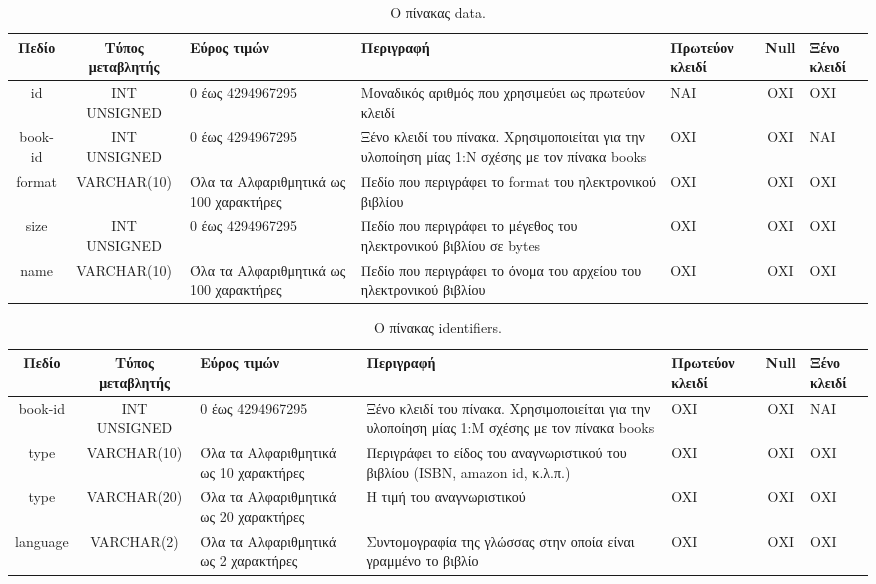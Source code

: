 \documentclass{assignment}
\begin{document}
\begin{landscape}
\begin{table}[htbp]
\begin{center}
  \begin{tabular}{|c|c|m{}|m{}|m{2.0cm}|c|m{1.5cm}|}
    \hline
    {\bf Πεδίο} & {\bf Τύπος μεταβλητής} & {\bf Εύρος τιμών} & {\bf Περιγραφή} & {\bf Πρωτεύον κλειδί} & {\bf Null} & {\bf Ξένο κλειδί} \\ \hline
    id & INT UNSIGNED & 0 έως 4294967295 & Μοναδικός αριθμός που χρησιμεύει ως πρωτεύον κλειδί & ΝΑΙ & ΟΧΙ & ΟΧΙ \\ \hline
    book-id & INT UNSIGNED & 0 έως 4294967295 & Ξένο κλειδί του πίνακα. Χρησιμοποιείται για την υλοποίηση μίας 1:Ν σχέσης με τον πίνακα books & OXI & ΟΧΙ & NAI \\ \hline
    format & VARCHAR(10) &  Όλα τα Αλφαριθμητικά ως 100 χαρακτήρες & Πεδίο που περιγράφει το format του ηλεκτρονικού βιβλίου & OXI & ΟΧΙ & ΟΧΙ \\ \hline
    size & INT UNSIGNED & 0 έως 4294967295 & Πεδίο που περιγράφει το μέγεθος του ηλεκτρονικού βιβλίου σε bytes & OXI & ΟΧΙ & ΟΧΙ \\ \hline
    name & VARCHAR(10) &  Όλα τα Αλφαριθμητικά ως 100 χαρακτήρες & Πεδίο που περιγράφει το όνομα του αρχείου του ηλεκτρονικού βιβλίου & OXI & ΟΧΙ & ΟΧΙ \\ \hline
  \end{tabular}
\caption{Ο πίνακας data.}
\label{table:db_table:data}
\end{center}
\end{table}
\end{landscape}

\begin{landscape}
\begin{table}[htbp]
\begin{center}
  \begin{tabular}{|c|c|m{}|m{}|m{2.0cm}|c|m{1.5cm}|}
    \hline
    {\bf Πεδίο} & {\bf Τύπος μεταβλητής} & {\bf Εύρος τιμών} & {\bf Περιγραφή} & {\bf Πρωτεύον κλειδί} & {\bf Null} & {\bf Ξένο κλειδί} \\ \hline
    book-id & INT UNSIGNED & 0 έως 4294967295 & Ξένο κλειδί του πίνακα. Χρησιμοποιείται για την υλοποίηση μίας 1:Μ σχέσης με τον πίνακα books & OXI & ΟΧΙ & NAI \\ \hline
    type & VARCHAR(10) & Όλα τα Αλφαριθμητικά ως 10 χαρακτήρες & Περιγράφει το είδος του αναγνωριστικού του βιβλίου (ISBN, amazon id, κ.λ.π.)  & OXI & ΟΧΙ & ΟΧΙ \\ \hline
    type & VARCHAR(20) & Όλα τα Αλφαριθμητικά ως 20 χαρακτήρες & Η τιμή του αναγνωριστικού  & OXI & ΟΧΙ & ΟΧΙ \\ \hline
    language & VARCHAR(2) & Όλα τα Αλφαριθμητικά ως 2 χαρακτήρες & Συντομογραφία της γλώσσας στην οποία είναι γραμμένο το βιβλίο  & OXI & ΟΧΙ & ΟΧΙ \\ \hline
  \end{tabular}
\caption{Ο πίνακας identifiers.}
\label{table::db_table:identifiers}
\end{center}
\end{table}
\end{landscape}
\end{document}
